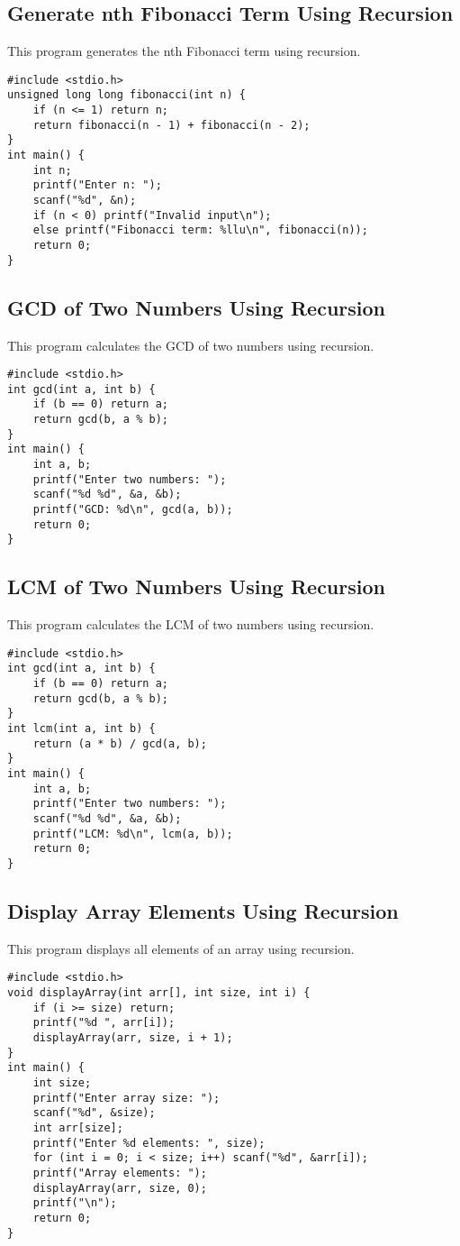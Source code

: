\documentclass[a4paper,12pt]{article}
\begin{document}
\subsection{Generate nth Fibonacci Term Using Recursion}
This program generates the nth Fibonacci term using recursion.
\begin{lstlisting}[caption={Generate nth Fibonacci Term Using Recursion}]
#include <stdio.h>
unsigned long long fibonacci(int n) {
    if (n <= 1) return n;
    return fibonacci(n - 1) + fibonacci(n - 2);
}
int main() {
    int n;
    printf("Enter n: ");
    scanf("%d", &n);
    if (n < 0) printf("Invalid input\n");
    else printf("Fibonacci term: %llu\n", fibonacci(n));
    return 0;
}
\end{lstlisting}
\clearpage

\subsection{GCD of Two Numbers Using Recursion}
This program calculates the GCD of two numbers using recursion.
\begin{lstlisting}[caption={GCD of Two Numbers Using Recursion}]
#include <stdio.h>
int gcd(int a, int b) {
    if (b == 0) return a;
    return gcd(b, a % b);
}
int main() {
    int a, b;
    printf("Enter two numbers: ");
    scanf("%d %d", &a, &b);
    printf("GCD: %d\n", gcd(a, b));
    return 0;
}
\end{lstlisting}
\clearpage

\subsection{LCM of Two Numbers Using Recursion}
This program calculates the LCM of two numbers using recursion.
\begin{lstlisting}[caption={LCM of Two Numbers Using Recursion}]
#include <stdio.h>
int gcd(int a, int b) {
    if (b == 0) return a;
    return gcd(b, a % b);
}
int lcm(int a, int b) {
    return (a * b) / gcd(a, b);
}
int main() {
    int a, b;
    printf("Enter two numbers: ");
    scanf("%d %d", &a, &b);
    printf("LCM: %d\n", lcm(a, b));
    return 0;
}
\end{lstlisting}
\clearpage

\subsection{Display Array Elements Using Recursion}
This program displays all elements of an array using recursion.
\begin{lstlisting}[caption={Display Array Elements Using Recursion}]
#include <stdio.h>
void displayArray(int arr[], int size, int i) {
    if (i >= size) return;
    printf("%d ", arr[i]);
    displayArray(arr, size, i + 1);
}
int main() {
    int size;
    printf("Enter array size: ");
    scanf("%d", &size);
    int arr[size];
    printf("Enter %d elements: ", size);
    for (int i = 0; i < size; i++) scanf("%d", &arr[i]);
    printf("Array elements: ");
    displayArray(arr, size, 0);
    printf("\n");
    return 0;
}
\end{lstlisting}
\clearpage
\end{document}
